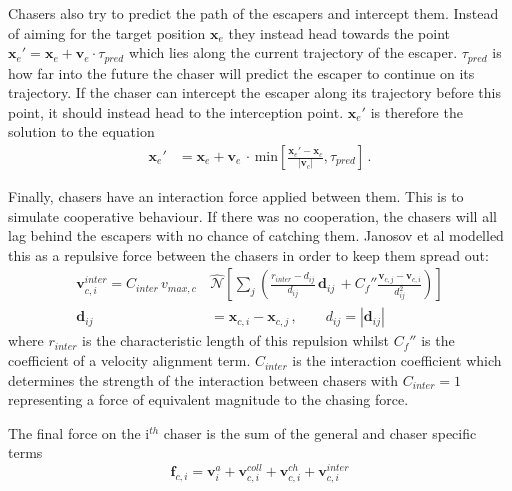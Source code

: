 \documentclass[%
11pt,
amsmath, amssymb,
aps,
pra
]{revtex4-2}
\begin{document}
Chasers also try to predict the path of the escapers and intercept them. Instead of aiming for the target position 
\(\mathbf{x}_e\) they instead head towards the point \(\mathbf{x}_e' = \mathbf{x}_e + \mathbf{v}_e\cdot\tau_{pred}\) 
which lies along the current trajectory of the escaper. \(\tau_{pred}\) is how far into the future the chaser will predict the
escaper to continue on its trajectory. If the chaser can intercept the escaper along its trajectory before this point,
it should instead head to the interception point. \(\mathbf{x}_e'\) is therefore the solution to the equation
\begin{align}
    \mathbf{x}_e' &= \mathbf{x}_e + \mathbf{v}_e\,\cdot\,\text{min}\left[ 
        \frac{\mathbf{x}_e' - \mathbf{x}_c}{|\mathbf{v}_c|}, \tau_{pred}
    \right]\,.
\end{align} 

Finally, chasers have an interaction force applied between them. This is to simulate cooperative behaviour. If there was
no cooperation, the chasers will all lag behind the escapers with no chance of catching them. Janosov et al modelled 
this as a repulsive force between the chasers in order to keep them spread out:
\begin{align}
    \mathbf{v}_{c,i}^{inter} = C_{inter} \, v_{max, c}\, &\hat{\mathcal{N}}\left[ 
        \sum_{j}\left( \frac{r_{inter} - d_{ij}}{d_{ij}} \, \mathbf{d}_{ij} \,+ C_f''
        \frac{\mathbf{v}_{c, j} - \mathbf{v}_{c, i}}{d_{ij}^2} \right)
    \right] \\
    \mathbf{d}_{ij} &= \mathbf{x}_{c, i} - \mathbf{x}_{c, j}\,, \quad\quad d_{ij} = |\mathbf{d}_{ij}|
\end{align}
where \(r_{inter}\) is the characteristic length of this repulsion whilst \(C_f''\) is the coefficient of a velocity alignment term.
\(C_{inter}\) is the interaction coefficient which determines the strength of the interaction between chasers with 
\(C_{inter}=1\) representing a force of equivalent magnitude to the chasing force. 

The final force on the i\(^{th}\) chaser is the sum of the general and chaser specific terms
\begin{equation}
    \mathbf{f}_{c, i} = \mathbf{v}_i^a + \mathbf{v}_{c, i}^{coll} + \mathbf{v}_{c, i}^{ch} + \mathbf{v}_{c,i}^{inter}
\end{equation}
\end{document}
